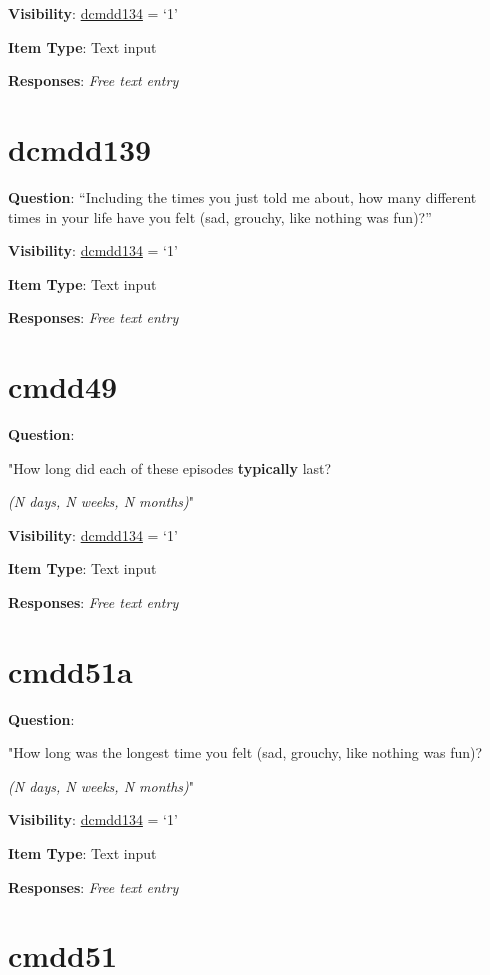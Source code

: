 \documentclass[]{book}
\begin{document}
\textbf{Visibility}: \protect\hyperlink{dcmdd134}{dcmdd134} = `1'

\textbf{Item Type}: Text input

\textbf{Responses}: \emph{Free text entry}

\hypertarget{dcmdd139}{%
\section{dcmdd139}\label{dcmdd139}}

\textbf{Question}: ``Including the times you just told me about, how many different times in your life have you felt (sad, grouchy, like nothing was fun)?''

\textbf{Visibility}: \protect\hyperlink{dcmdd134}{dcmdd134} = `1'

\textbf{Item Type}: Text input

\textbf{Responses}: \emph{Free text entry}

\hypertarget{cmdd49}{%
\section{cmdd49}\label{cmdd49}}

\textbf{Question}:

"How long did each of these episodes \textbf{typically} last?

\emph{(N days, N weeks, N months)}"

\textbf{Visibility}: \protect\hyperlink{dcmdd134}{dcmdd134} = `1'

\textbf{Item Type}: Text input

\textbf{Responses}: \emph{Free text entry}

\hypertarget{cmdd51a}{%
\section{cmdd51a}\label{cmdd51a}}

\textbf{Question}:

"How long was the longest time you felt (sad, grouchy, like nothing was fun)?

\emph{(N days, N weeks, N months)}"

\textbf{Visibility}: \protect\hyperlink{dcmdd134}{dcmdd134} = `1'

\textbf{Item Type}: Text input

\textbf{Responses}: \emph{Free text entry}

\hypertarget{cmdd51}{%
\section{cmdd51}\label{cmdd51}}
\end{document}
